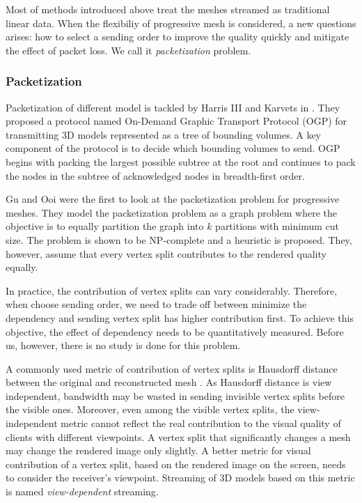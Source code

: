 \documentclass[11pt, a4paper]{report}
\begin{document}
    Most of methods introduced above treat the meshes streamed as 
    traditional linear data. When the flexibiliy of progressive mesh
    is considered, a new questions arises: how to select a sending order
    to improve the quality quickly and mitigate the effect of packet loss.
    We call it \emph{packetization} problem.
    
    \subsubsection{Packetization}
    \label{ss:intro:packetization}
    Packetization of different model is tackled by
    Harris III and Karvets in \cite{harris:design}.   
    They proposed a protocol named On-Demand Graphic Transport Protocol (OGP)
    for transmitting 3D models represented as a tree of bounding volumes.
    A key component of the protocol is to decide which bounding volumes
    to send.  OGP begins with packing the largest possible subtree at
    the root and continues to pack the nodes in the subtree of
    acknowledged nodes in breadth-first order.  
    
    Gu and Ooi \cite{Gu:Packetization} were the first to look at
    the packetization problem for progressive meshes.  They model
    the packetization problem as a graph problem where the objective
    is to equally partition the graph into $k$ partitions with minimum
    cut size.  The problem is shown to be NP-complete and a heuristic
    is proposed.  They, however, assume that every vertex split contributes 
    to the rendered quality equally.
    
    In practice, the contribution of vertex splits can
    vary considerably. Therefore, when choose sending order, we
    need to trade off between minimize the dependency and sending 
    vertex split has higher contribution first. To achieve this objective,
    the effect of dependency needs to be quantitatively measured.
    Before us, however, there is no study is done for this problem.

    A commonly used metric of contribution of vertex splits is 
    Hausdorff distance between the original and reconstructed mesh \cite{cignoni98metro}.
    As Hausdorff distance is view independent, 
    bandwidth may be wasted in sending invisible vertex splits
    before the visible ones. Moreover, even among the visible vertex splits,
    the view-independent metric cannot reflect the real contribution to the visual quality of
    clients with different viewpoints. A vertex split that significantly
    changes a mesh may change the rendered image 
    only slightly.  A better metric for visual contribution of a vertex split,
    based on the rendered image on the screen, 
    needs to consider the receiver's viewpoint.
    Streaming of 3D models based on this metric is named \emph{view-dependent} streaming.
\end{document}
